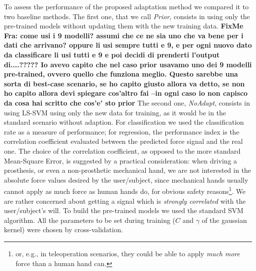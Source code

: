 To assess the performance of the proposed adaptation method we  compared it
to two baseline methods. The first one, that we call \emph{Prior}, consists in
using only the pre-trained models without updating them with the new training data.
{\bf FixMe Fra: come usi i 9 modelli? assumi che ce ne sia uno che va bene per i dati che arrivano? oppure li usi sempre tutti e 9, e per ogni nuovo dato da classificare li usi
tutti e 9 e poi decidi di prenderti l'output di....????? Io avevo capito che nel caso prior usavamo uno dei 9 modelli pre-trained, ovvero quello che funziona meglio. Questo sarebbe
una sorta di best-case scenario, se ho capito giusto allora va detto, se non ho capito allora devi spiegare cos'altro fai --in ogni caso io non capisco
da cosa hai scritto che cos'e' sto prior}
The second one, \emph{NoAdapt}, consists in using LS-SVM using only the new data
for training, as it would be in the standard scenario without adaption.
For classification we used the classification rate as a measure of
performance; for regression, the performance index is the correlation coefficient
evaluated between the predicted force signal and the real one. The
choice of the correlation coefficient, as opposed to the more standard
Mean-Square Error, is suggested by a practical consideration: when
driving a prosthesis, or even a non-prosthetic mechanical hand, we are
not interested in the absolute force values desired by the
user/subject, since mechanical hands usually cannot apply as much
force as human hands do, for obvious safety reasons\footnote{or, e.g.,
in teleoperation scenarios, they could be able to apply \emph{much
more} force than a human hand can.}. We are rather concerned about
getting a signal which is \emph{strongly correlated} with the
user/subject's will. 
To build the  pre-trained models we used the standard SVM algorithm. All the parameters to be set during %
training ($C$ and $\gamma$ of the gaussian kernel) were chosen by cross-validation.

